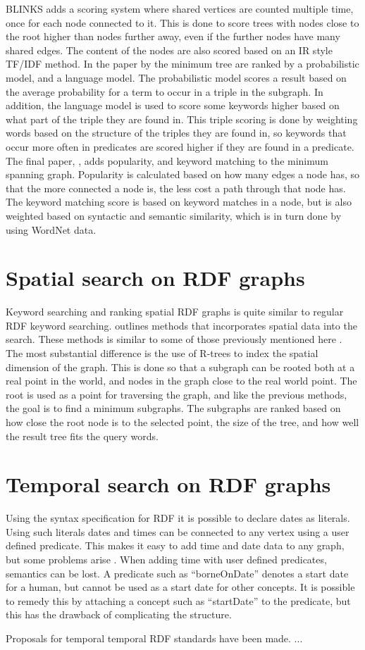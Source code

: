 BLINKS adds a scoring system where shared vertices are counted multiple time, once for each node connected to it. This is done to score trees with nodes close to the root higher than nodes further away, even if the further nodes have many shared edges. The content of the nodes are also scored based on an IR style TF/IDF method. In the paper by \cite{Elbassuoni:2011:KSO:2063576.2063615} the minimum tree are ranked by a probabilistic model, and a language model. The probabilistic model scores a result based on the average probability for a term to occur in a triple in the subgraph. In addition, the language model is used to score some keywords higher based on what part of the triple they are found in. This triple scoring is done by weighting words based on the structure of the triples they are found in, so keywords that occur more often in predicates are scored higher if they are found in a predicate. The final paper, \cite{4812421}, adds popularity, and keyword matching to the minimum spanning graph. Popularity is calculated based on how many edges a node has, so that the more connected a node is, the less cost a path through that node has. The keyword matching score is based on keyword matches in a node, but is also weighted based on syntactic and semantic similarity, which is in turn done by using WordNet data.


\section{Spatial search on RDF graphs}
Keyword searching and ranking spatial RDF graphs is quite similar to regular RDF keyword searching. \cite{Shi:2016:TRS:2882903.2882941} outlines methods that incorporates spatial data into the search. These methods is similar to some of those previously mentioned here \citep{4812421, Elbassuoni:2011:KSO:2063576.2063615}. The most substantial difference is the use of R-trees to index the spatial dimension of the graph. This is done so that a subgraph can be rooted both at a real point in the world, and nodes in the graph close to the real world point. The root is used as a point for traversing the graph, and like the previous methods, the goal is to find a minimum subgraphs. The subgraphs are ranked based on how close the root node is to the selected point, the size of the tree, and how well the result tree fits the query words.

\section{Temporal search on RDF graphs}
Using the syntax specification for RDF \cite{beckett2004rdf} it is possible to declare dates as literals. Using such literals dates and times can be connected to any vertex using a user defined predicate. This makes it easy to add time and date data to any graph, but some problems arise \cite{tappolet2009applied}. When adding time with user defined predicates, semantics can be lost. A predicate such as ``borneOnDate'' denotes a start date for a human, but cannot be used as a start date for other concepts. It is possible to remedy this by attaching a concept such as ``startDate'' to the predicate, but this has the drawback of complicating the structure.

Proposals for temporal temporal RDF standards have been made. ...\\

\glsresetall
